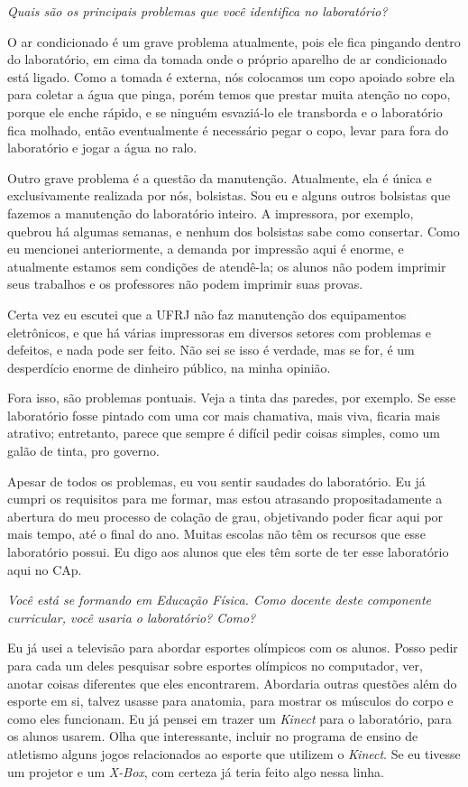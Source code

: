 \textit{Quais são os principais problemas que você identifica no laboratório?}

O ar condicionado é um grave problema atualmente, pois ele fica pingando dentro do laboratório, em cima da tomada onde o próprio aparelho de ar condicionado está ligado. Como a tomada é externa, nós colocamos um copo apoiado sobre ela para coletar a água que pinga, porém temos que prestar muita atenção no copo, porque ele enche rápido, e se ninguém esvaziá-lo ele transborda e o laboratório fica molhado, então eventualmente é necessário pegar o copo, levar para fora do laboratório e jogar a água no ralo.

Outro grave problema é a questão da manutenção. Atualmente, ela é única e exclusivamente realizada por nós, bolsistas. Sou eu e alguns outros bolsistas que fazemos a manutenção do laboratório inteiro. A impressora, por exemplo, quebrou há algumas semanas, e nenhum dos bolsistas sabe como consertar. Como eu mencionei anteriormente, a demanda por impressão aqui é enorme, e atualmente estamos sem condições de atendê-la; os alunos não podem imprimir seus trabalhos e os professores não podem imprimir suas provas.

Certa vez eu escutei que a UFRJ não faz manutenção dos equipamentos eletrônicos, e que há várias impressoras em diversos setores com problemas e defeitos, e nada pode ser feito. Não sei se isso é verdade, mas se for, é um desperdício enorme de dinheiro público, na minha opinião.

Fora isso, são problemas pontuais. Veja a tinta das paredes, por exemplo. Se esse laboratório fosse pintado com uma cor mais chamativa, mais viva, ficaria mais atrativo; entretanto, parece que sempre é difícil pedir coisas simples, como um galão de tinta, pro governo.

Apesar de todos os problemas, eu vou sentir saudades do laboratório. Eu já cumpri os requisitos para me formar, mas estou atrasando propositadamente a abertura do meu processo de colação de grau, objetivando poder ficar aqui por mais tempo, até o final do ano. Muitas escolas não têm os recursos que esse laboratório possui. Eu digo aos alunos que eles têm sorte de ter esse laboratório aqui no CAp.

\textit{Você está se formando em Educação Física. Como docente deste componente curricular, você usaria o laboratório? Como?}

Eu já usei a televisão para abordar esportes olímpicos com os alunos. Posso pedir para cada um deles pesquisar sobre esportes olímpicos no computador, ver, anotar coisas diferentes que eles encontrarem. Abordaria outras questões além do esporte em si, talvez usasse para anatomia, para mostrar os músculos do corpo e como eles funcionam. Eu já pensei em trazer um \textit{Kinect} para o laboratório, para os alunos usarem. Olha que interessante, incluir no programa de ensino de atletismo alguns jogos relacionados ao esporte que utilizem o \textit{Kinect}. Se eu tivesse um projetor e um \textit{X-Box}, com certeza já teria feito algo nessa linha.

